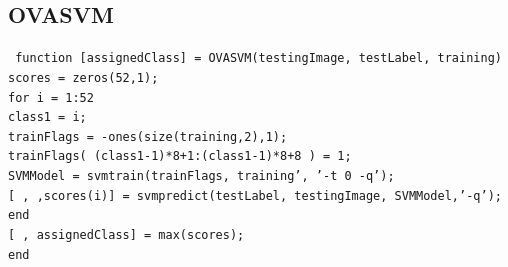 \documentclass[10pt,twocolumn,letterpaper]{article}
\begin{document}
\subsection{OVASVM}
{\tt\small
function [assignedClass] = OVASVM(testingImage, testLabel, training)\\
scores = zeros(52,1);\\
for i = 1:52\\
    class1 = i;\\
    
    trainFlags = -ones(size(training,2),1);\\
    trainFlags( (class1-1)*8+1:(class1-1)*8+8 ) = 1;\\
    
    SVMModel = svmtrain(trainFlags, training', '-t 0 -q');\\

    [~,~,scores(i)] = svmpredict(testLabel, testingImage, SVMModel,'-q');\\

end\\

[~, assignedClass] = max(scores);\\
end\\
}
\end{document}
